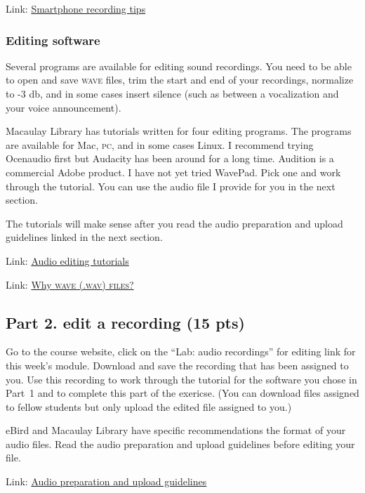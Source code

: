 \documentclass[12pt]{article}
\begin{document}
Link: \href{https://support.ebird.org/en/support/solutions/articles/48001064305-smartphone-recording-tips}{Smartphone recording tips}

\subsubsection*{Editing software}

Several programs are available for editing sound recordings. You need to be able to open and save \textsc{wave} files, trim the start and end of your recordings, normalize to -3 db, and in some cases insert silence (such as between a vocalization and your voice announcement).

Macaulay Library has tutorials written for four editing programs. The programs are available for Mac, \textsc{pc,} and in some cases Linux. I recommend trying Ocenaudio first but Audacity has been around for a long time. Audition is a commercial Adobe product. I have not yet tried WavePad. Pick one and work through the tutorial. You can use the audio file I provide for you in the next section. 

The tutorials will make sense after you read the audio preparation and upload guidelines linked in the next section.

Link: \href{https://www.macaulaylibrary.org/resources/audio-editing-tutorials/}{Audio editing tutorials}

Link: \href{https://www.macaulaylibrary.org/resources/why-wav/}{Why \textsc{wave (.wav) files?}}

\subsection*{Part 2. edit a recording (15 pts)}

Go to the course website, click on the “Lab: audio recordings” for editing link for this week's module. Download and save the recording that has been assigned to you. Use this recording to work through the tutorial for the software you chose in Part~1 and to complete this part of the exericse. (You can download files assigned to fellow students but only upload the edited file assigned to you.)

eBird and Macaulay Library have specific recommendations the format of your audio files. Read the audio preparation and upload guidelines before editing your file.

Link: \href{https://support.ebird.org/en/support/solutions/articles/48001064341-audio-preparation-and-upload-guidelines}{Audio preparation and upload guidelines}
\end{document}
